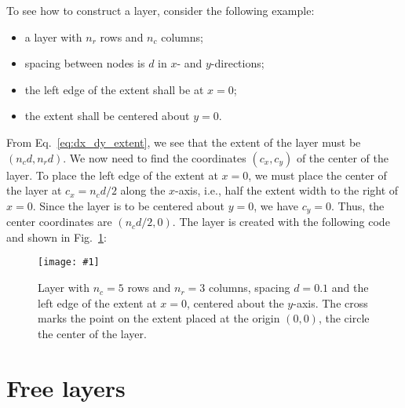 \documentclass[a4paper,12pt]{report}
\newcommand{\scriptfig}[4]{%
\begin{figure}
\centerline{\texttt{[image: \#1]}}
\caption[#3]{#4}
\label{fig:#1}
\end{figure}%
}
\begin{document}
To see how to construct a layer, consider the following example: 
\begin{itemize}
\item a layer with $n_r$ rows and $n_c$ columns;
\item spacing between nodes is $d$ in $x$- and $y$-directions;
\item the left edge of the extent shall be at $x=0$;
\item the extent shall be centered about $y=0$.
\end{itemize}
From Eq.~\ref{eq:dx_dy_extent}, we see that the extent of the layer
must be $(n_c d, n_r d)$. We now need to find the coordinates $(c_x,
c_y)$ of the center of the layer. To place the left edge of the extent
at $x=0$, we must place the center of the layer at $c_x=n_c d / 2$
along the $x$-axis, i.e., half the extent width to the right of
$x=0$. Since the layer is to be centered about $y=0$, we have
$c_y=0$. Thus, the center coordinates are $(n_c d/2, 0)$. The layer is
created with the following code and shown in Fig.~\ref{fig:layer3a}:
%

\scriptfig{layer3a}{0.5}{Layer construction example}%
{Layer with $n_c=5$ rows and $n_r=3$ columns, spacing $d=0.1$ and the
  left edge of the extent at $x=0$, centered about the $y$-axis. The
  cross marks the point on the extent placed at the origin $(0,0)$,
the circle the center of the layer.}
%


\section{Free layers}\label{sec:freelayer}
\end{document}
